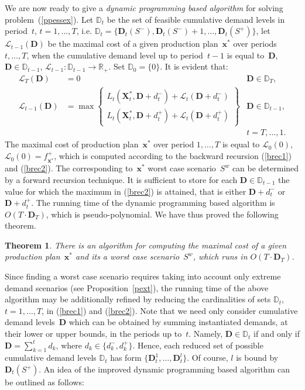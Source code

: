 \documentclass[11pt]{article}
\newtheorem{thm}{Theorem}
\newcommand{\Rset}{\mathbb{R}}
\begin{document}
We are now ready to give a \emph{dynamic programming based  algorithm} for solving 
problem~(\ref{ppessex}). Let  $\mathbb{D}_t$ be the set of feasible 
cumulative demand levels in period~$t$, $t=1,\ldots, T$, i.e.
$\mathbb{D}_t=\{\mathbf{D}_t(S^{-}), \mathbf{D}_t(S^{-})+1,\ldots, \mathbf{D}_t(S^{+})\}$,
let $\mathcal{L}_{t-1}(\mathbf{D})$ be the maximal cost of a given production plan~$\pmb{x}^{*}$
over periods $t,\ldots,T$, when the cumulative demand level up to period~$t-1$ is
equal to~$\mathbf{D}$, $\mathbf{D}\in \mathbb{D}_{t-1}$, 
$\mathcal{L}_{t-1}: \mathbb{D}_{t-1}\rightarrow\Rset_{+}$.
Set 
$\mathbb{D}_0=\{0\}$. It is evident that:
\begin{align}
\mathcal{L}_{T}(\mathbf{D})&=0  &\mathbf{D}\in \mathbb{D}_{T},\label{brec1}\\
\mathcal{L}_{t-1}(\mathbf{D})&=\max\left\{
\begin{array}{l}
L_t(\mathbf{X}^{*}_t,\mathbf{D}+d^{-}_t)+\mathcal{L}_{t}(\mathbf{D}+d^{-}_t)\label{brec2}\\
L_t(\mathbf{X}^{*}_t,\mathbf{D}+d^{+}_t)+\mathcal{L}_{t}(\mathbf{D}+d^{+}_t)
\end{array}  
\right\}
&\mathbf{D}\in \mathbb{D}_{t-1},\\
&&t=T,\ldots,1.\nonumber
\end{align}
The maximal cost of production plan~$\pmb{x}^{*}$ over period $1,\ldots,T$ is
equal to  $\mathcal{L}_{0}(0)$, $\mathcal{L}_{0}(0)=f_{\pmb{x}^{*}}^{+}$,
which is computed according to the backward recursion (\ref{brec1}) and (\ref{brec2}).
The corresponding to~$\pmb{x}^{*}$  worst case scenario~$S^{w}$ can be determined
by a forward recursion technique. It is sufficient to store for 
each $\mathbf{D}\in \mathbb{D}_{t-1}$ the value for which 
the maximum in (\ref{brec2}) is attained, that is
either $\mathbf{D}+d^{-}_t$ or $\mathbf{D}+d^{+}_t$.
The running time of the dynamic programming based  algorithm is
$O(T \cdot \mathbf{D}_T)$, which is pseudo-polynomial.
We have  thus proved the following theorem.
\begin{thm}
There is an algorithm 
for computing the maximal cost of 
a given production plan~$\pmb{x}^{*}$ and its a worst case scenario~$S^{w}$,
which runs in $O(T \cdot \mathbf{D}_T)$.
\end{thm}
Since finding a worst case scenario
requires  taking into account only
extreme demand scenarios (see Proposition~\ref{pext}),
the running time of the above algorithm may be additionally refined
by reducing the cardinalities  
of sets  $\mathbb{D}_{t}$, $t=1,\ldots,T$,
in (\ref{brec1}) and (\ref{brec2}).
Note that we need only consider 
cumulative demand levels~$\mathbf{D}$  which
can be obtained by summing  instantiated    demands, 
at  their lower or upper bounds, in the periods up to~$t$.
Namely,  $\mathbf{D}\in \mathbb{D}_{t}$
if and only if  $\mathbf{D}=\sum_{k=1}^{t} d_k$, where
$d_k\in \{d^{-}_k, d^{+}_k\}$.
Hence, each  reduced set
of possible  cumulative demand levels
$\mathbb{D}_{t}$ has form $\{\mathbf{D}^1_t,\ldots, \mathbf{D}^l_t\}$.
Of course, $l$ is bound  by
 $\mathbf{D}_t(S^{+})$.
 An idea of  the improved
dynamic programming based  algorithm can be outlined as follows:
\end{document}
